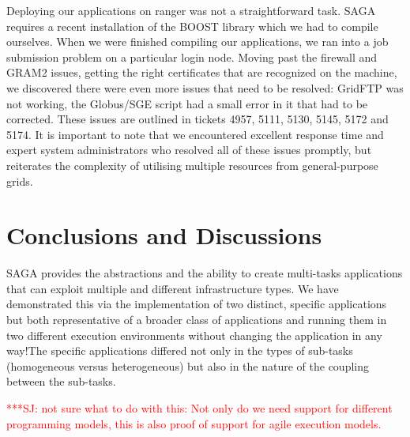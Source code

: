 \documentclass[conference,final]{IEEEtran}
\newcommand{\up}{\vspace*{-1em}}
\newcommand{\upp}{\vspace*{-0.5em}}
\newcommand{\jhanote}[1]{ {\textcolor{red} { ***SJ: #1 }}}
\newcommand{\jhanote}[1]{}
\begin{document}
Deploying our applications on ranger was not a straightforward task.
SAGA requires a recent installation of the BOOST library which we had
to compile ourselves. When we were finished compiling our
applications, we ran into a job submission problem on a particular
login node. %
Moving past the firewall and GRAM2 issues, getting the right
certificates that are recognized on the machine, we discovered there
were even more issues that need to be resolved: GridFTP was not
working, the Globus/SGE script had a small error in it that had to be
corrected. These issues are outlined in tickets 4957, 5111, 5130,
5145, 5172 and 5174. It is important to note that we encountered
excellent response time and expert system administrators who resolved
all of these issues promptly, but reiterates the complexity of
utilising multiple resources from general-purpose grids.




\up\upp

\section{Conclusions and Discussions}

\up\upp

SAGA provides the abstractions and the ability to create multi-tasks
applications that can exploit multiple and different infrastructure
types.  We have demonstrated this via the implementation of two
distinct, specific applications but both representative of a broader
class of applications and running them in two different execution
environments without changing the application in any way!The specific
applications differed not only in the types of sub-tasks (homogeneous
versus heterogeneous) but also in the nature of the coupling between
the sub-tasks.
  
\jhanote{not sure what to do with this: Not only do we need support
  for different programming models, this is also proof of support for
  agile execution models.}
\end{document}
